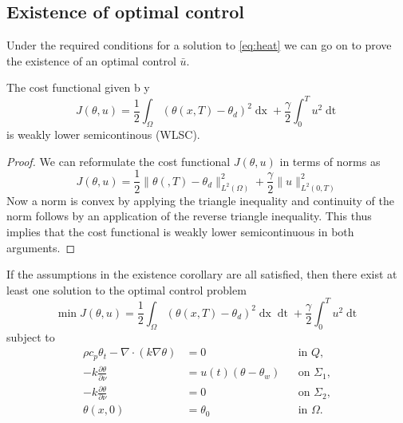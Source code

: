 \subsection{Existence of optimal control}
Under the required conditions for a solution to \eqref{eq:heat} we can go on to prove the existence of an optimal control $\bar{u}$. 

\begin{lemma}[WLSC]
    The cost functional given b y
    \begin{equation*}
         J(\theta, u) = \frac{1}{2} \int_\Omega (\theta(x, T) - \theta_d)^2 \mathop{dx} + \frac{\gamma}{2} \int_0^{T} u^2 \mathop{dt}
    \end{equation*}
    is weakly lower semicontinous (WLSC). 
\end{lemma}

\begin{proof}
We can reformulate the cost functional $J(\theta, u)$ in terms of norms as 
\begin{equation*}
    J(\theta, u) = \frac{1}{2}\|\theta (,T) - \theta_d \|_{L^2(\Omega)}^2 + \frac{\gamma}{2}\|u\|_{L^2(0,T)}^2
\end{equation*}
Now a norm is convex by applying the triangle inequality and continuity of the norm follows by an application of the reverse triangle inequality. This thus implies that the cost functional is weakly lower semicontinuous in both arguments.
\end{proof}

\begin{theorem}
If the assumptions in the existence corollary are all satisfied, then there exist at least one solution to the optimal control problem 
\begin{equation*}
       \min J(\theta, u) = \frac{1}{2} \int_\Omega (\theta(x, T) - \theta_d)^2 \mathop{dx} \mathop{dt} + \frac{\gamma}{2} \int_0^{T} u^2 \mathop{dt}
\end{equation*}
subject to
\begin{align*}
       \rho c_p \theta_t - \nabla \cdot (k \nabla \theta) &= 0 &&\text{in } Q,  \\
      -k \frac{\partial \theta}{\partial \nu} &= u(t) (\theta - \theta_w) &&\text{on } \Sigma_1, \\
      -k \frac{\partial \theta}{\partial \nu} &= 0 \quad &&\text{on } \Sigma_2, \\
      \theta(x, 0) &= \theta_0 && \text{in $\Omega$.}
\end{align*}
\end{theorem}

